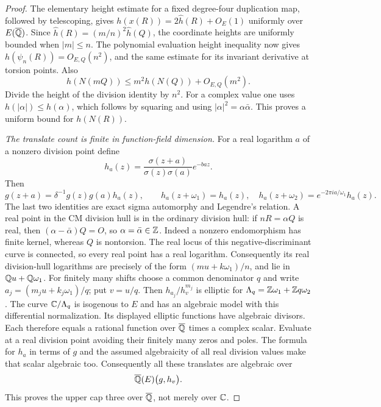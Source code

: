 \begin{proof}
The elementary height estimate for a fixed degree-four
duplication map, followed by telescoping, gives
$h(x(R))=2\widehat h(R)+O_E(1)$ uniformly over
$E(\overline{\mathbb Q})$.  Since
$\widehat h(R)=(m/n)^2\widehat h(Q)$, the coordinate heights
are uniformly bounded when $|m|\leq n$.
The polynomial evaluation height inequality
\citep[Lemma 1.0]{gramain1986values} now gives
$h(\psi_n(R))=O_{E,Q}(n^2)$, and the same estimate for its
invariant derivative at torsion points.  Also
\[
 h(N(mQ))\leq m^2h(N(Q))+O_{E,Q}(m^2).
\]
Divide the height of the division identity by $n^2$.
For a complex value one uses
$h(|\alpha|)\leq h(\alpha)$, which follows by squaring and
using $|\alpha|^2=\alpha\bar\alpha$.
This proves a uniform bound for $h(N(R))$.

\emph{The translate count is finite in function-field dimension.}
For a real logarithm $a$ of a nonzero division point define
\[
 h_a(z)=\frac{\sigma(z+a)}{\sigma(z)\sigma(a)}e^{-baz}.
\]
Then
\[
 g(z+a)=\delta^{-1}g(z)g(a)h_a(z),\qquad
 h_a(z+\omega_1)=h_a(z),\quad
 h_a(z+\omega_2)=e^{-2\pi ia/\omega_1}h_a(z).
\]
The last two identities are exact sigma automorphy and Legendre's
relation.  A real point in the CM division hull is in the ordinary
division hull: if $nR=\alpha Q$ is real, then
$(\alpha-\bar\alpha)Q=O$, so $\alpha=\bar\alpha\in\mathbb Z$.
Indeed a nonzero endomorphism has finite kernel, whereas $Q$
is nontorsion.  The real locus of this negative-discriminant
curve is connected, so every real point has a real logarithm.
Consequently its real division-hull logarithms are precisely
of the form $(mu+k\omega_1)/n$, and lie in
$\mathbb Q u+\mathbb Q\omega_1$.
For finitely many shifts choose a common denominator
$q$ and write $a_j=(m_ju+k_j\omega_1)/q$; put $v=u/q$.
Then $h_{a_j}/h_v^{m_j}$ is elliptic for
$\Lambda_q=\mathbb Z\omega_1+\mathbb Z q\omega_2$.
The curve $\mathbb C/\Lambda_q$ is isogenous to $E$ and has an
algebraic model with this differential normalization.
Its displayed elliptic functions have algebraic divisors.
Each therefore equals a rational function over $\overline{\mathbb Q}$
times a complex scalar.  Evaluate at a real division point
avoiding their finitely many zeros and poles.  The formula
for $h_a$ in terms of $g$ and the assumed algebraicity of all
real division values make that scalar algebraic too.
Consequently all these translates are algebraic over
\[
 \overline{\mathbb Q}(E)\bigl(g,h_v\bigr).
\]
This proves the upper cap three over $\overline{\mathbb Q}$, not merely
over $\mathbb C$.


\end{proof}
